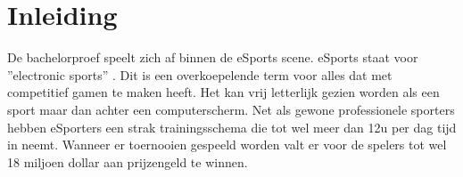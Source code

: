 \documentclass[pdftex,a4paper,12pt,twoside]{report}
\begin{document}


\tableofcontents



\chapter{Inleiding}
\label{ch:inleiding}

De bachelorproef speelt zich af binnen de eSports scene. eSports staat voor ''electronic sports'' \citep{BenDirs2015}. Dit is een overkoepelende term voor alles dat met competitief gamen te maken heeft. Het kan vrij letterlijk gezien worden als een sport maar dan achter een computerscherm. Net als gewone professionele sporters hebben eSporters een strak trainingsschema die tot wel meer dan 12u per dag tijd in neemt. Wanneer er toernooien gespeeld worden valt er voor de spelers tot wel 18 miljoen dollar aan prijzengeld te winnen. \citep{dota2theinternational} 
\\
\end{document}
